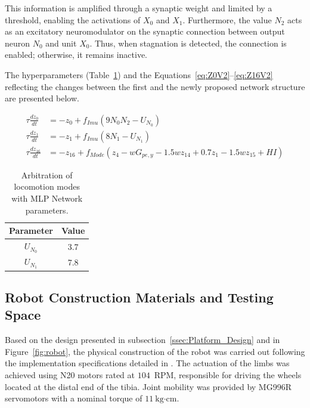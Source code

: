 \documentclass[preprint,12pt]{elsarticle}
\begin{document}
This information is amplified through a synaptic weight and limited by a threshold, enabling the activations of $X_0$ and $X_1$. Furthermore, the value $N_2$ acts as an excitatory neuromodulator on the synaptic connection between output neuron $N_0$ and unit $X_0$. Thus, when stagnation is detected, the connection is enabled; otherwise, it remains inactive. 

The hyperparameters (Table~\ref{table:Locom_MLP}) and the Equations~\eqref{eq:Z0V2}–\eqref{eq:Z16V2} reflecting the changes between the first and the newly proposed network structure are presented below. 

\begin{align}
\tau \frac{dz_0}{dt} &= -z_0 + f_{Imu}(9 N_{0} N_{2} - U_{N_{0}})
\label{eq:Z0V2}
\\
\tau \frac{dz_1}{dt} &= -z_1 +  f_{Imu}(8 N_{1} - U_{N_{1}})
\\
\tau \frac{dz_{16}}{dt} &= -z_{16} +  f_{Mode}( z_4 - wG_{pe,y} - 1.5wz_{14}  + 0.7z_1 - 1.5wz_{15} + HI)
\label{eq:Z16V2}
\end{align}

\begin{table}%
\centering
\caption{Arbitration of locomotion modes with MLP Network parameters.}
\begin{tabular}{|c|c|}
\hline
\textbf{Parameter} & \textbf{Value} \\ \hline

$U_{N_{0}}$ & 3.7 \\ \hline
$U_{N_{1}}$ & 7.8 \\ \hline

\end{tabular}
\label{table:Locom_MLP}
\end{table}

\subsection{Robot Construction Materials and Testing Space}
\label{ssec:Construction}

Based on the design presented in subsection~\ref{ssec:Platform_Design} and in Figure~\ref{fig:robot}, the physical construction of the robot was carried out following the implementation specifications detailed in \citep{Grajales_Des_2025}. The actuation of the limbs was achieved using N20 motors rated at $104$~RPM, responsible for driving the wheels located at the distal end of the tibia. Joint mobility was provided by MG996R servomotors with a nominal torque of $11~\text{kg·cm}$. 
\end{document}
